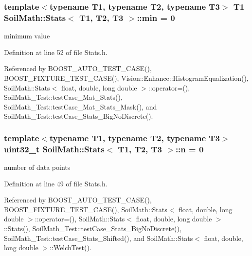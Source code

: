 \hypertarget{class_soil_math_1_1_stats_aa44c07a23b1c2ce0f0407e7cee4f39a9}{}
\subsubsection[{min}]{\setlength{\rightskip}{0pt plus 5cm}template$<$typename T1, typename T2, typename T3$>$ T1 {\bf Soil\+Math\+::\+Stats}$<$ T1, T2, T3 $>$\+::min = 0}\label{class_soil_math_1_1_stats_aa44c07a23b1c2ce0f0407e7cee4f39a9}
minimum value 

Definition at line 52 of file Stats.\+h.



Referenced by B\+O\+O\+S\+T\+\_\+\+A\+U\+T\+O\+\_\+\+T\+E\+S\+T\+\_\+\+C\+A\+S\+E(), B\+O\+O\+S\+T\+\_\+\+F\+I\+X\+T\+U\+R\+E\+\_\+\+T\+E\+S\+T\+\_\+\+C\+A\+S\+E(), Vision\+::\+Enhance\+::\+Histogram\+Equalization(), Soil\+Math\+::\+Stats$<$ float, double, long double $>$\+::operator=(), Soil\+Math\+\_\+\+Test\+::test\+Case\+\_\+\+Mat\+\_\+\+Stats(), Soil\+Math\+\_\+\+Test\+::test\+Case\+\_\+\+Mat\+\_\+\+Stats\+\_\+\+Mask(), and Soil\+Math\+\_\+\+Test\+::test\+Case\+\_\+\+Stats\+\_\+\+Big\+No\+Discrete().

\hypertarget{class_soil_math_1_1_stats_a7bc57af334b68253832ebac17f85d091}{}
\subsubsection[{n}]{\setlength{\rightskip}{0pt plus 5cm}template$<$typename T1, typename T2, typename T3$>$ uint32\+\_\+t {\bf Soil\+Math\+::\+Stats}$<$ T1, T2, T3 $>$\+::n = 0}\label{class_soil_math_1_1_stats_a7bc57af334b68253832ebac17f85d091}
number of data points 

Definition at line 49 of file Stats.\+h.



Referenced by B\+O\+O\+S\+T\+\_\+\+A\+U\+T\+O\+\_\+\+T\+E\+S\+T\+\_\+\+C\+A\+S\+E(), B\+O\+O\+S\+T\+\_\+\+F\+I\+X\+T\+U\+R\+E\+\_\+\+T\+E\+S\+T\+\_\+\+C\+A\+S\+E(), Soil\+Math\+::\+Stats$<$ float, double, long double $>$\+::operator=(), Soil\+Math\+::\+Stats$<$ float, double, long double $>$\+::\+Stats(), Soil\+Math\+\_\+\+Test\+::test\+Case\+\_\+\+Stats\+\_\+\+Big\+No\+Discrete(), Soil\+Math\+\_\+\+Test\+::test\+Case\+\_\+\+Stats\+\_\+\+Shifted(), and Soil\+Math\+::\+Stats$<$ float, double, long double $>$\+::\+Welch\+Test().

